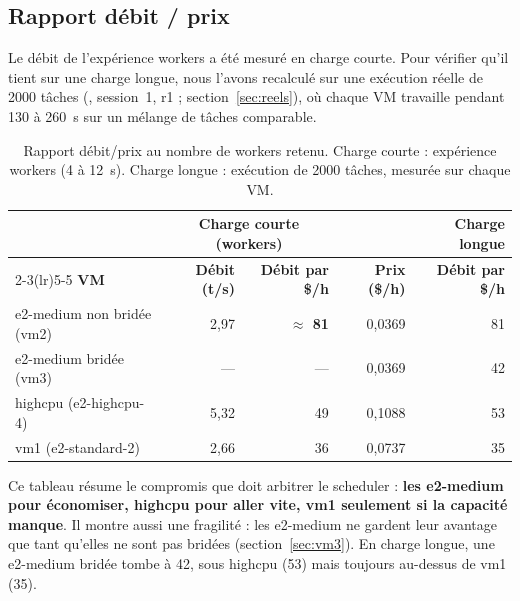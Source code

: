 \subsection{Rapport débit / prix}

Le débit de l'expérience workers a été mesuré en charge courte. Pour vérifier
qu'il tient sur une charge longue, nous l'avons recalculé sur une exécution réelle
de 2000 tâches (\sel{}, session~1, r1 ; section~\ref{sec:reels}), où chaque VM
travaille pendant 130 à 260~s sur un mélange de tâches comparable.

\begin{table}[H]
\centering\small
\begin{tabular}{lrrrr}
\toprule
 & \multicolumn{2}{c}{\textbf{Charge courte (workers)}} & & \textbf{Charge longue} \\
\cmidrule(lr){2-3}\cmidrule(lr){5-5}
\textbf{VM} & \textbf{Débit (t/s)} & \textbf{Débit par \$/h} & \textbf{Prix (\$/h)} & \textbf{Débit par \$/h} \\
\midrule
e2-medium non bridée (vm2) & 2,97 & \textbf{$\approx$ 81} & 0,0369 & 81 \\
e2-medium bridée (vm3)     & —    & —                     & 0,0369 & 42 \\
highcpu (e2-highcpu-4)     & 5,32 & 49                    & 0,1088 & 53 \\
vm1 (e2-standard-2)        & 2,66 & 36                    & 0,0737 & 35 \\
\bottomrule
\end{tabular}
\caption{Rapport débit/prix au nombre de workers retenu. Charge courte :
expérience workers (4 à 12~s). Charge longue : exécution de 2000 tâches,
mesurée sur chaque VM.}
\label{tab:debitprix}
\end{table}

Ce tableau résume le compromis que doit arbitrer le scheduler : \textbf{les
e2-medium pour économiser, highcpu pour aller vite, vm1 seulement si la capacité
manque}. Il montre aussi une fragilité : les e2-medium ne gardent leur avantage
que tant qu'elles ne sont pas bridées (section~\ref{sec:vm3}). En charge longue,
une e2-medium bridée tombe à 42, sous highcpu (53) mais toujours au-dessus de
vm1 (35).
